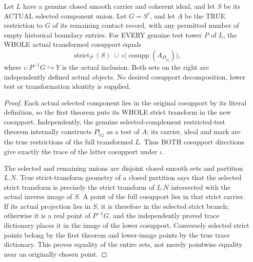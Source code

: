 \begin{theorem}
\label{hir:actual-selected-nonzero-contact-whole-cosupport-decomposition}
\leanok
Let $L$ have a genuine closed smooth carrier and coherent ideal, and let
$S$ be its ACTUAL selected component union. Let $G=S^c$, and let $A$ be
the TRUE restriction to $G$ of its remaining contact record, with any
permitted number of empty historical boundary entries. For EVERY genuine
test tower $P$ of $L$, the WHOLE actual transformed cosupport equals
\[
 \operatorname{strict}_P(S)\ \cup\
 \iota\bigl(\operatorname{cosupp}(A_{P|_G})\bigr),
\]
where $\iota:P^{-1}G\hookrightarrow Y$ is the actual inclusion. Both
sets on the right are independently defined actual objects. No desired
cosupport decomposition, lower test or transformation identity is supplied.
\end{theorem}
\begin{proof}
Each actual selected component lies in the original cosupport by its
literal definition, so the first theorem puts its WHOLE strict transform
in the new cosupport. Independently, the genuine selected-complement
restricted-test theorem internally constructs $P|_G$ as a test of $A$;
its carrier, ideal and mark are the true restrictions of the full
transformed $L$. Thus BOTH cosupport directions give exactly the trace
of the latter cosupport under $\iota$.

The selected and remaining unions are disjoint closed smooth sets and
partition $L.N$. True strict-transform geometry of a closed partition says
that the selected strict transform is precisely the strict transform of
$L.N$ intersected with the actual inverse image of $S$. A point of the
full cosupport lies in that strict carrier. If its actual projection lies
in $S$, it is therefore in the selected strict branch; otherwise it is a
real point of $P^{-1}G$, and the independently proved trace dictionary
places it in the image of the lower cosupport. Conversely selected strict
points belong by the first theorem and lower-image points by the true
trace dictionary. This proves equality of the entire sets, not merely
pointwise equality near an originally chosen point.
\end{proof}

